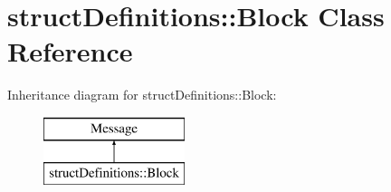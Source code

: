 \hypertarget{classstruct_definitions_1_1_block}{}\section{struct\+Definitions\+:\+:Block Class Reference}
\label{classstruct_definitions_1_1_block}
Inheritance diagram for struct\+Definitions\+:\+:Block\+:\begin{figure}[H]
\begin{center}
\leavevmode
\includegraphics[height=2.000000cm]{classstruct_definitions_1_1_block}
\end{center}
\end{figure}
